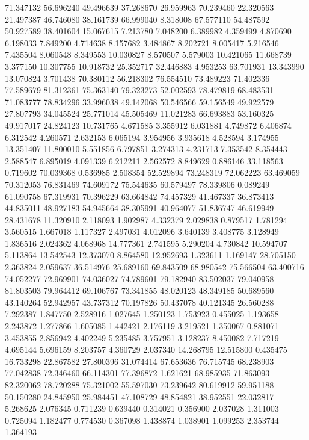 71.347132
56.696240
49.496639
37.268670
26.959963
70.239460
22.320563
21.497387
46.746080
38.161739
66.999040
8.318008
67.577110
54.487592
50.927589
38.401604
15.067615
7.213780
7.048200
6.389982
4.359499
4.870690
6.198033
7.849200
4.714638
8.157682
3.484867
8.202721
8.005417
5.216546
7.435504
8.060548
8.349553
10.030827
8.570507
5.579003
10.421065
11.668739
3.377150
10.307755
10.918732
25.352717
32.446883
4.953253
63.701931
13.343990
13.070824
3.701438
70.380112
56.218302
76.554510
73.489223
71.402336
77.589679
81.312361
75.363140
79.323273
52.002593
78.479819
68.483531
71.083777
78.834296
33.996038
49.142068
50.546566
59.156549
49.922579
27.807793
34.045524
25.771014
45.505469
11.021283
66.693883
53.160325
49.917017
24.824123
10.731765
4.671585
3.355912
6.031881
4.749872
6.406874
6.312542
4.260571
2.632153
6.065194
3.954956
3.935618
4.528594
3.174955
13.351407
11.800010
5.551856
6.797851
3.274313
4.231713
7.353542
8.354443
2.588547
6.895019
4.091339
6.212211
2.562572
8.849629
0.886146
33.118563
0.719602
70.039368
0.536985
2.508354
52.529894
73.248319
72.062223
63.469059
70.312053
76.831469
74.609172
75.544635
60.579497
78.339806
0.089249
61.090758
67.319931
70.396229
63.664842
74.457329
41.467337
36.873413
44.835011
48.927183
54.945664
38.305991
40.964077
51.836747
46.619949
28.431678
11.320910
2.118093
1.902987
4.332379
2.029838
0.879517
1.781294
3.560515
1.667018
1.117327
2.497031
4.012096
3.640139
3.408775
3.128949
1.836516
2.024362
4.068968
14.777361
2.741595
5.290204
4.730842
10.594707
5.113864
13.542543
12.373070
8.864580
12.952693
1.323611
1.169147
28.705150
2.363824
2.059637
36.514976
25.689160
69.843509
68.980542
75.566504
63.400716
74.052277
72.969901
74.036027
74.789601
79.182940
83.502037
79.040958
81.803503
79.964412
69.106767
73.341855
48.020123
48.349185
50.689560
43.140264
52.942957
43.737312
70.197826
50.437078
40.121345
26.560288
7.292387
1.847750
2.528916
1.027645
1.250123
1.753923
0.455025
1.193658
2.243872
1.277866
1.605085
1.442421
2.176119
3.219521
1.350067
0.881071
3.453855
2.856942
4.402249
5.235485
3.757951
3.128237
8.450082
7.717219
4.695144
5.696159
8.203757
4.360729
2.037340
14.268795
12.515800
0.435475
16.733298
22.867582
27.800396
31.074414
67.653636
76.715745
68.238903
77.042838
72.346460
66.114301
77.396872
1.621621
68.985935
71.863093
82.320062
78.720288
75.321002
55.597030
73.239642
80.619912
59.951188
50.150280
24.845950
25.984451
47.108729
48.854821
38.952551
22.032817
5.268625
2.076345
0.711239
0.639440
0.314021
0.356900
2.037028
1.311003
0.725094
1.182477
0.774530
0.367098
1.438874
1.038901
1.099253
2.353744
1.364193
